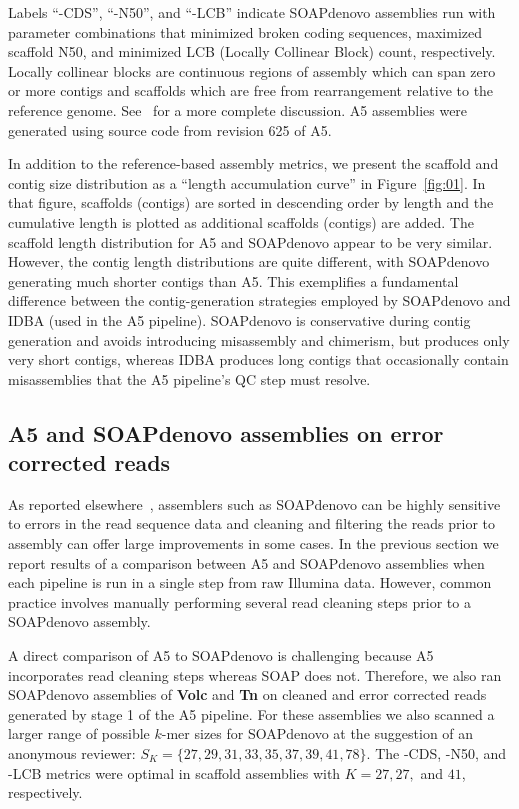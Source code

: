 \documentclass[10pt]{article}
\begin{document}
Labels ``-CDS'', ``-N50'', and ``-LCB'' indicate SOAPdenovo assemblies run with parameter combinations that minimized broken coding 
sequences, maximized scaffold N50, and minimized LCB (Locally Collinear Block) count, respectively. Locally collinear blocks are continuous regions of assembly which can span zero or more contigs and scaffolds which are free from rearrangement relative to the reference genome. See~\cite{mauve,Darling2011} for a more complete discussion.
A5 assemblies were generated using source code from revision 625 of A5.

In addition to the reference-based assembly metrics, we present the scaffold and contig size distribution as a ``length accumulation curve'' in Figure~\ref{fig:01}. 
In that figure, scaffolds (contigs) are sorted in descending order by length and the cumulative length is plotted as additional scaffolds (contigs) are added.
The scaffold length distribution for A5 and SOAPdenovo appear to be very similar. However, the contig length distributions are quite different, with SOAPdenovo generating much shorter contigs than A5.
This exemplifies a fundamental difference between the contig-generation strategies employed by SOAPdenovo and IDBA (used in the A5 pipeline).
SOAPdenovo is conservative during contig generation and avoids introducing misassembly and chimerism, but produces only very short contigs, whereas IDBA produces long contigs that occasionally contain misassemblies that the A5 pipeline's QC step must resolve.

\subsection*{A5 and SOAPdenovo assemblies on error corrected reads}

As reported elsewhere~\cite{Salzberg2011}, assemblers such as SOAPdenovo can be highly sensitive to errors in the read sequence data and cleaning and filtering the reads prior to assembly can offer large improvements in some cases.
In the previous section we report results of a comparison between A5 and SOAPdenovo assemblies when each pipeline is run in a single step from raw Illumina data.
However, common practice involves manually performing several read cleaning steps prior to a SOAPdenovo assembly.

A direct comparison of A5 to SOAPdenovo is challenging because A5 incorporates read cleaning steps whereas SOAP does not. Therefore, we also ran SOAPdenovo assemblies of \textbf{Volc} and \textbf{Tn} on cleaned and error corrected reads generated by stage 1 of the A5 pipeline.
For these assemblies we also scanned a larger range of possible $k$-mer sizes for SOAPdenovo at the suggestion of an anonymous reviewer: $S_K = \{27,29,31,33,35,37,39,41,78\}$. The -CDS, -N50, and -LCB metrics were optimal in scaffold assemblies with $K=27, 27,$ and $41$, respectively.
\end{document}
